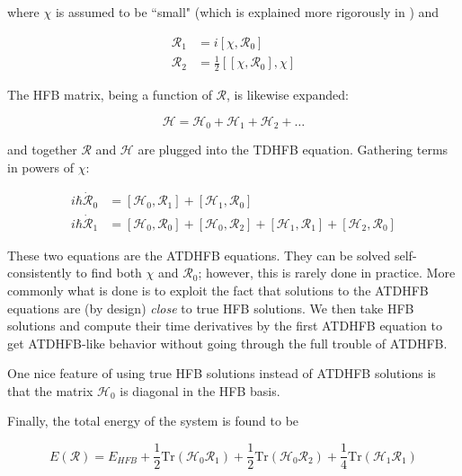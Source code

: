 \noindent where $\chi$ is assumed to be ``small" (which is explained more rigorously in \cite{Baranger1978}) and

\begin{align}\label{eqn:densities}
\mathcal{R}_1 &= i\left[\chi, \mathcal{R}_0\right] \\
\mathcal{R}_2 &= \frac{1}{2}\left[\left[\chi, \mathcal{R}_0\right], \chi\right] 
\end{align}

\noindent The HFB matrix, being a function of $\mathcal{R}$, is likewise expanded:

\begin{equation*}
\mathcal{H} = \mathcal{H}_0 + \mathcal{H}_1 + \mathcal{H}_2 + \dots
\end{equation*}

\noindent and together $\mathcal{R}$ and $\mathcal{H}$ are plugged into the TDHFB equation. Gathering terms in powers of $\chi$:

\begin{align}\label{eqn:ATDHFB_eqns}
i\hbar\mathcal{\dot{R}}_0 &= \left[\mathcal{H}_0, \mathcal{R}_1\right] + \left[\mathcal{H}_1, \mathcal{R}_0\right] \\
i\hbar\mathcal{\dot{R}}_1 &= \left[\mathcal{H}_0, \mathcal{R}_0\right] + \left[\mathcal{H}_0, \mathcal{R}_2\right]
 + \left[\mathcal{H}_1, \mathcal{R}_1\right] + \left[\mathcal{H}_2, \mathcal{R}_0\right]
\end{align}

\noindent These two equations are the ATDHFB equations. They can be solved self-consistently to find both $\chi$ and $\mathcal{R}_0$; however, this is rarely done in practice. More commonly what is done is to exploit the fact that solutions to the ATDHFB equations are (by design) \textit{close} to true HFB solutions. We then take HFB solutions and compute their time derivatives by the first ATDHFB equation to get ATDHFB-like behavior without going through the full trouble of ATDHFB.

One nice feature of using true HFB solutions instead of ATDHFB solutions is that the matrix $\mathcal{H}_0$ is diagonal in the HFB basis.

Finally, the total energy of the system is found to be

\begin{equation*}
E(\mathcal{R}) = E_{HFB} + \frac{1}{2}\mathrm{Tr}\left(\mathcal{H}_0\mathcal{R}_1\right) + \frac{1}{2}\mathrm{Tr}\left(\mathcal{H}_0\mathcal{R}_2\right) + \frac{1}{4}\mathrm{Tr}\left(\mathcal{H}_1\mathcal{R}_1\right)
\end{equation*}

